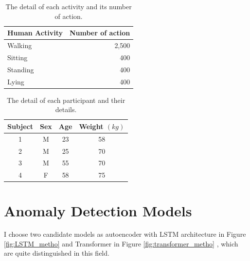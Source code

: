 \begin{table}[H]
\begin{center}
\caption[The detail of each activity and its number of action.]{The detail of each activity and its number of action. \\ \hspace{\textwidth}}\label{tab:number_action}
\begin{tabular}{ l r }
  \textbf{Human Activity} & \textbf{Number of action}\\
\hline
Walking & 2,500 \\
\hline
Sitting & 400 \\
\hline
Standing & 400 \\
\hline
Lying & 400 \\
\hline
   \end{tabular}
\end{center}
 \end{table}
 
\begin{table}[H]
\begin{center}
\caption[The detail of each participant and their details.
]{The detail of each participant and their details. 
\\ \hspace{\textwidth}}\label{tab:participants}
\begin{tabular}{c c c c}
  \textbf{Subject} & \textbf{Sex} &  \textbf{Age} & \textbf{Weight $(kg)$}  \\
\hline

1 & M & 23  & 58 \\
\hline

2 & M & 25  & 70 \\
\hline

3 & M & 55  & 70 \\
\hline

4 & F & 58  & 75 \\
\hline

   \end{tabular}
\end{center}
 \end{table}
 
\section{Anomaly Detection Models}
\paragraph{}
I choose two candidate models as autoencoder with LSTM architecture in Figure \ref{fig:LSTM_metho} and Transformer in Figure \ref{fig:transformer_metho} , which are quite distinguished in this field.

